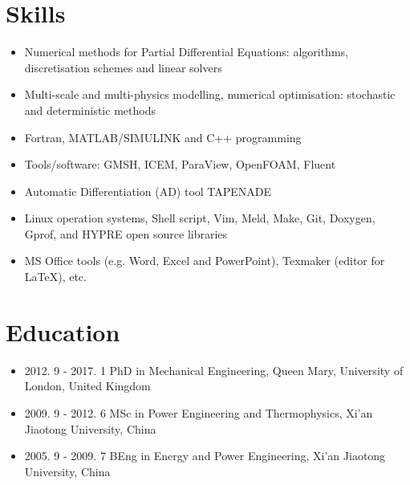 \documentclass[letterpaper]{article}
\begin{document}
\section*{Skills}
\vspace{-10pt}
\begin{itemize}
\item Numerical methods for Partial Differential Equations: algorithms, discretisation schemes and linear solvers
\item Multi-scale and multi-physics modelling, numerical optimisation: stochastic and deterministic methods
\item Fortran, MATLAB/SIMULINK and C++ programming
\item Tools/software: GMSH, ICEM, ParaView, OpenFOAM, Fluent%
\item Automatic Differentiation (AD) tool TAPENADE
\item Linux operation systems, Shell script, Vim, Meld, Make, Git, Doxygen, Gprof, and HYPRE open source libraries
\item MS Office tools (e.g. Word, Excel and PowerPoint), Texmaker (editor for \LaTeX), etc.
\end{itemize}

\vspace{-12pt}
\section*{Education}
\vspace{-10pt}
\begin{itemize}
  \item 2012. 9 - 2017. 1 \hspace{2pt} PhD in Mechanical Engineering, Queen Mary, University of London, United Kingdom
  \item 2009. 9 - 2012. 6 \hspace{2pt} MSc in Power Engineering and Thermophysics, Xi’an Jiaotong University, China
  \item 2005. 9 - 2009. 7 \hspace{2pt} BEng in Energy and Power Engineering, Xi’an Jiaotong University, China
\end{itemize}
\end{document}
